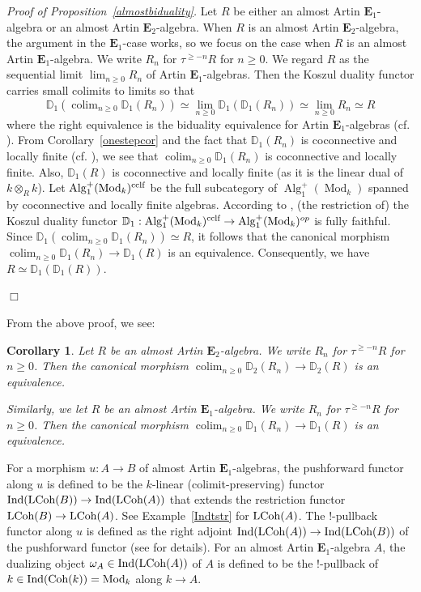 \documentclass[leqno,12pt]{amsart}
\theoremstyle{plain}
\newtheorem{Corollary}[Theorem]{Corollary}
\theoremstyle{definition}
\newcommand{\DD}{\mathbb{D}}
\newcommand{\Mod}{\operatorname{Mod}}
\newcommand{\colim}{\operatorname{colim}}
\newcommand{\Alg}{\operatorname{Alg}}
\newcommand{\Ind}{\operatorname{Ind}}
\newcommand{\eone}{\mathbf{E}_1}
\newcommand{\etwo}{\mathbf{E}_2}
\newcommand{\QED}{{\unskip\nobreak\hfil\penalty50\quad\null\nobreak\hfil
{$\Box$}\parfillskip0pt\finalhyphendemerits0\par\medskip}}
\begin{document}
{\it Proof of Proposition~\ref{almostbiduality}.}
Let $R$ be either an almost Artin $\eone$-algebra or an almost Artin $\etwo$-algebra.
When $R$ is an almost Artin $\etwo$-algebra,
the argument in the $\eone$-case works, so we focus on the case when $R$ is an almost Artin $\eone$-algebra. 
We write $R_n$ for $\tau^{\ge -n}R$ for $n\ge0$.
We regard 
$R$ as the sequential limit $\lim_{n\ge0 }R_n$ of Artin $\eone$-algebras.
Then the Koszul duality functor carries small colimits to limits so that
\[
\DD_1(\colim_{n\ge0}\DD_1(R_n))\simeq \lim_{n\ge0}\DD_1(\DD_1(R_n))\simeq \lim_{n\ge0}R_n\simeq R
\]
where the right equivalence is the biduality equivalence for Artin $\eone$-algebras (cf. \cite[X, Section 3]{DAG}).
From Corollary~\ref{onestepcor} and  the fact that $\DD_1(R_n)$ is coconnective and locally finite (cf. \cite[X Lemma 4.5.9]{DAG}),
we see that $\colim_{n\ge0}\DD_1(R_n)$ is coconnective and locally finite.
Also, $\DD_1(R)$ is coconnective and locally finite (as it is the linear dual of $k\otimes_Rk$).
Let $\Alg_1^+(\Mod_k)^{\textup{cclf}}$ be the full subcategory
of $\Alg_1^+(\Mod_k)$ spanned by coconnective and locally finite algebras.
According to \cite[X, Corollary 3.1.15]{DAG}, 
(the restriction of) the Koszul duality functor $\DD_1:\Alg_1^+(\Mod_k)^{\textup{cclf}}\to \Alg_1^+(\Mod_k)^{op}$
is fully faithful. 
Since $\DD_1(\colim_{n\ge0}\DD_1(R_n))\simeq R$,
it follows that the canonical morphism $\colim_{n\ge0}\DD_1(R_n)\to \DD_1(R)$ is an equivalence.
Consequently, we have $R\simeq \DD_1(\DD_1(R))$.
\QED




From the above proof, we see:

\begin{Corollary}
\label{limitkoszul}
Let $R$ be an almost Artin $\etwo$-algebra.
We write $R_n$ for $\tau^{\ge -n}R$ for $n\ge0$.
Then the canonical morphism $\colim_{n\ge0}\DD_2(R_n)\to \DD_2(R)$ is an equivalence.

Similarly, we let $R$ be an almost Artin $\eone$-algebra.
We write $R_n$ for $\tau^{\ge -n}R$ for $n\ge0$.
Then the canonical morphism $\colim_{n\ge0}\DD_1(R_n)\to \DD_1(R)$ is an equivalence.
\end{Corollary}



For a morphism $u:A\to B$ of almost Artin $\eone$-algebras, the pushforward functor along
$u$ is defined to be the $k$-linear (colimit-preserving) functor $\Ind(\textup{LCoh}(B))\to \Ind(\textup{LCoh}(A))$
that extends the restriction functor $\textup{LCoh}(B)\to \textup{LCoh}(A)$. See Example~\ref{Indtstr} for $\textup{LCoh}(A)$.
The $!$-pullback functor along $u$ is defined as the right adjoint $\Ind(\textup{LCoh}(A))\to  \Ind(\textup{LCoh}(B))$
of the pushforward functor (see \cite[Appendix]{CKDA} for details).
For an almost Artin $\eone$-algebra $A$, the dualizing object $\omega_A\in \Ind(\textup{LCoh}(A))$ of $A$ is defined to be the $!$-pullback of $k\in \Ind(\textup{Coh}(k))=\Mod_k$ along $k\to A$.  
\end{document}
